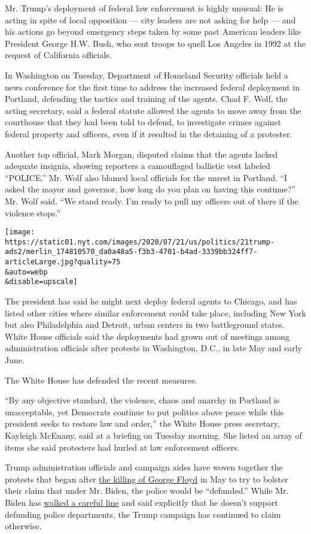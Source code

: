 Mr. Trump's deployment of federal law enforcement is highly unusual: He
is acting in spite of local opposition --- city leaders are not asking
for help --- and his actions go beyond emergency steps taken by some
past American leaders like President George H.W. Bush, who sent troops
to quell Los Angeles in 1992 at the request of California officials.

In Washington on Tuesday, Department of Homeland Security officials held
a news conference for the first time to address the increased federal
deployment in Portland, defending the tactics and training of the
agents. Chad F. Wolf, the acting secretary, said a federal statute
allowed the agents to move away from the courthouse that they had been
told to defend, to investigate crimes against federal property and
officers, even if it resulted in the detaining of a protester.

Another top official, Mark Morgan, disputed claims that the agents
lacked adequate insignia, showing reporters a camouflaged ballistic vest
labeled ``POLICE.'' Mr. Wolf also blamed local officials for the unrest
in Portland. ``I asked the mayor and governor, how long do you plan on
having this continue?'' Mr. Wolf said. ``We stand ready. I'm ready to
pull my officers out of there if the violence stops.''

\texttt{[image: https://static01.nyt.com/images/2020/07/21/us/politics/21trump-ads2/merlin\_174810570\_da0a48a5-f3b3-4701-b4ad-3339bb324ff7-articleLarge.jpg?quality=75\\\&auto=webp\\\&disable=upscale]}

The president has said he might next deploy federal agents to Chicago,
and has listed other cities where similar enforcement could take place,
including New York but also Philadelphia and Detroit, urban centers in
two battleground states. White House officials said the deployments had
grown out of meetings among administration officials after protests in
Washington, D.C., in late May and early June.

The White House has defended the recent measures.

``By any objective standard, the violence, chaos and anarchy in Portland
is unacceptable, yet Democrats continue to put politics above peace
while this president seeks to restore law and order,'' the White House
press secretary, Kayleigh McEnany, said at a briefing on Tuesday
morning. She listed an array of items she said protesters had hurled at
law enforcement officers.

Trump administration officials and campaign aides have woven together
the protests that began after
\href{https://www.nytimes.com/2020/05/31/us/george-floyd-investigation.html}{the
killing of George Floyd} in May to try to bolster their claim that under
Mr. Biden, the police would be ``defunded.'' While Mr. Biden has
\href{https://www.nytimes.com/2020/06/08/us/politics/biden-defund-the-police.html}{walked
a careful line} and said explicitly that he doesn't support defunding
police departments, the Trump campaign has continued to claim otherwise.

